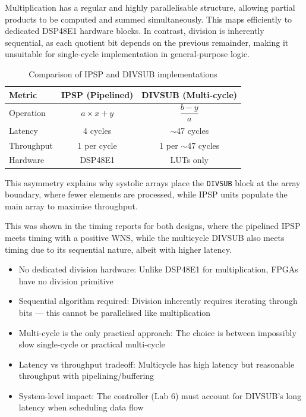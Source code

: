 \documentclass[a4paper,12pt]{article}
\begin{document}
Multiplication has a regular and highly parallelisable structure, allowing partial products to be computed and summed simultaneously. This maps efficiently to dedicated DSP48E1 hardware blocks. In contrast, division is inherently sequential, as each quotient bit depends on the previous remainder, making it unsuitable for single-cycle implementation in general-purpose logic.

\begin{table}[h]
\centering
\begin{tabular}{l c c}
\hline
\textbf{Metric} & \textbf{IPSP (Pipelined)} & \textbf{DIVSUB (Multi-cycle)} \\
\hline
Operation & $a \times x + y$ & $\dfrac{b - y}{a}$ \\
Latency & 4 cycles & $\sim$47 cycles \\
Throughput & 1 per cycle & 1 per $\sim$47 cycles \\
Hardware & DSP48E1 & LUTs only \\
\hline
\end{tabular}
\caption{Comparison of IPSP and DIVSUB implementations}
\end{table}

This asymmetry explains why systolic arrays place the \texttt{DIVSUB} block at the array boundary, where fewer elements are processed, while IPSP units populate the main array to maximise throughput.

This was shown in the timing reports for both designs, where the pipelined IPSP meets timing with a positive WNS, while the multi\-cycle DIVSUB also meets timing due to its sequential nature, albeit with higher latency.

\begin{itemize}
    \item No dedicated division hardware: Unlike DSP48E1 for multiplication, FPGAs have no division primitive
    \item Sequential algorithm required: Division inherently requires iterating through bits — this cannot be parallelised like multiplication
    \item Multi-cycle is the only practical approach: The choice is between impossibly slow single-cycle or practical multi-cycle
    \item Latency vs throughput trade\-off: Multi\-cycle has high latency but reasonable throughput with pipelining/buffering
    \item System-level impact: The controller (Lab 6) must account for DIVSUB's long latency when scheduling data flow
\end{itemize}
\end{document}
